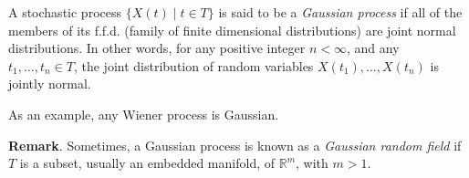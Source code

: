 \documentclass[12pt]{article}
\begin{document}

A stochastic process $\lbrace X(t)\mid t\in T\rbrace$ is said to be
a \emph{Gaussian process} if all of the members of its f.f.d.
(family of finite dimensional distributions) are joint normal
distributions.  In other words, for any positive integer $n<\infty$,
and any $t_1,\ldots,t_n\in T$, the joint distribution of random
variables $X(t_1),\ldots,X(t_n)$ is jointly normal.

As an example, any Wiener process is Gaussian.

\textbf{Remark}.  Sometimes, a Gaussian process is known as a \emph{Gaussian random field} if $T$ is a subset, usually an embedded manifold, of $\mathbb{R}^m$, with $m>1$.
\end{document}
